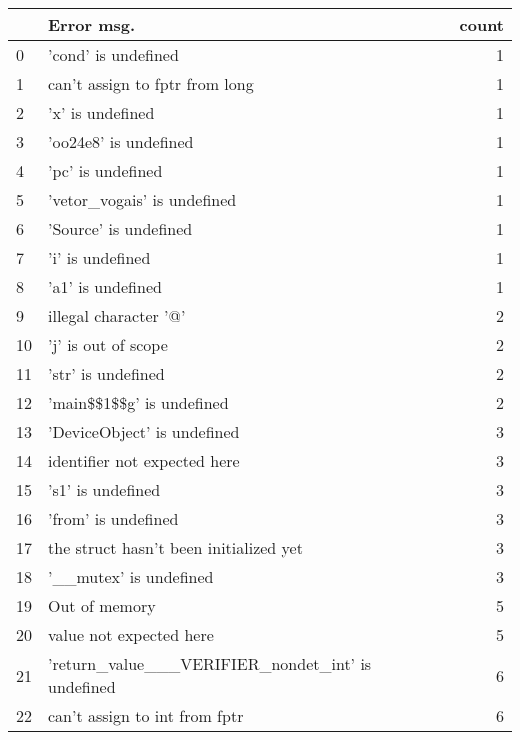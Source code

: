 \documentclass[notitlepage]{article}
\begin{document}
\begin{tabular}{llr}
\toprule
{} &                                         Error msg. &  count \\
\midrule
0  &                                'cond' is undefined &      1 \\
1  &                    can't assign to fptr  from long &      1 \\
2  &                                   'x' is undefined &      1 \\
3  &                              'oo24e8' is undefined &      1 \\
4  &                                  'pc' is undefined &      1 \\
5  &                        'vetor\_vogais' is undefined &      1 \\
6  &                              'Source' is undefined &      1 \\
7  &                                   'i' is undefined &      1 \\
8  &                                  'a1' is undefined &      1 \\
9  &                              illegal character '@' &      2 \\
10 &                                'j' is out of scope &      2 \\
11 &                                 'str' is undefined &      2 \\
12 &                          'main\$\$1\$\$g' is undefined &      2 \\
13 &                        'DeviceObject' is undefined &      3 \\
14 &                       identifier not expected here &      3 \\
15 &                                  's1' is undefined &      3 \\
16 &                                'from' is undefined &      3 \\
17 &             the struct hasn't been initialized yet &      3 \\
18 &                             '\_\_mutex' is undefined &      3 \\
19 &                                      Out of memory &      5 \\
20 &                            value not expected here &      5 \\
21 &  'return\_value\_\_\_VERIFIER\_nondet\_int' is undefined &      6 \\
22 &                     can't assign to int from fptr  &      6 \\

\end{tabular}
\end{document}
